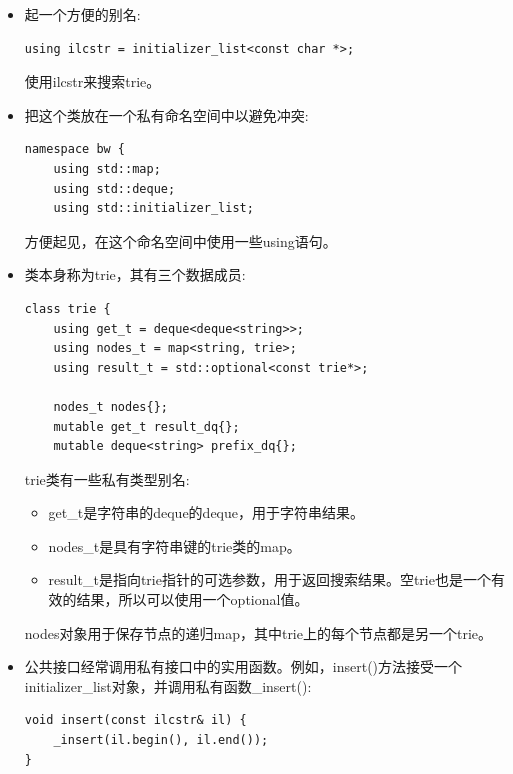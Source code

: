 \begin{itemize}
\item 
起一个方便的别名:

\begin{lstlisting}[style=styleCXX]
using ilcstr = initializer_list<const char *>;
\end{lstlisting}

使用ilcstr来搜索trie。

\item 
把这个类放在一个私有命名空间中以避免冲突:

\begin{lstlisting}[style=styleCXX]
namespace bw {
	using std::map;
	using std::deque;
	using std::initializer_list;
\end{lstlisting}

方便起见，在这个命名空间中使用一些using语句。

\item 
类本身称为trie，其有三个数据成员:

\begin{lstlisting}[style=styleCXX]
class trie {
	using get_t = deque<deque<string>>;
	using nodes_t = map<string, trie>;
	using result_t = std::optional<const trie*>;
	
	nodes_t nodes{};
	mutable get_t result_dq{};
	mutable deque<string> prefix_dq{};
\end{lstlisting}

trie类有一些私有类型别名:

\begin{itemize}
\item 
get\_t是字符串的deque的deque，用于字符串结果。

\item 
nodes\_t是具有字符串键的trie类的map。

\item 
result\_t是指向trie指针的可选参数，用于返回搜索结果。空trie也是一个有效的结果，所以可以使用一个optional值。
\end{itemize}

nodes对象用于保存节点的递归map，其中trie上的每个节点都是另一个trie。

\item 
公共接口经常调用私有接口中的实用函数。例如，insert()方法接受一个initializer\_list对象，并调用私有函数\_insert():

\begin{lstlisting}[style=styleCXX]
void insert(const ilcstr& il) {
	_insert(il.begin(), il.end());
}
\end{lstlisting}


\end{itemize}

